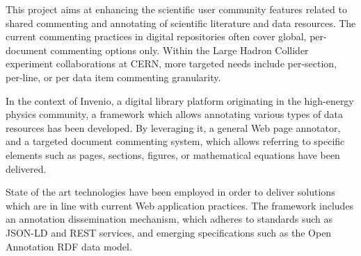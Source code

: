 
This project aims at enhancing the scientific user community features related
to shared commenting and annotating of scientific literature and data
resources.  The current commenting practices in digital repositories often
cover global, per-document commenting options only. Within the Large Hadron
Collider experiment collaborations at CERN, more targeted needs include
per-section, per-line, or per data item commenting granularity.

In the context of Invenio, a digital library platform originating in the
high-energy physics community, a framework which allows annotating various
types of data resources has been developed. By leveraging it, a general Web
page annotator, and a targeted document commenting system, which allows
referring to specific elements such as pages, sections, figures, or
mathematical equations have been delivered.

State of the art technologies have been employed in order to deliver solutions
which are in line with current Web application practices. The framework
includes an annotation dissemination mechanism, which adheres to standards such
as JSON-LD and REST services, and emerging specifications such as the Open
Annotation RDF data model.
